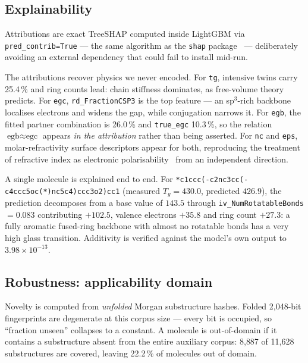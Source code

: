 \documentclass[11pt,a4paper]{article}
\newcommand{\prop}[1]{\texttt{#1}}
\begin{document}
\subsection{Explainability}

Attributions are exact TreeSHAP computed inside LightGBM via
\texttt{pred\_contrib=True} --- the same algorithm as the \texttt{shap}
package~\cite{lundberg2017,lundberg2020} --- deliberately avoiding an external
dependency that could fail to install mid-run.

The attributions recover physics we never encoded. For \prop{tg}, intensive
twins carry 25.4\,\% and ring counts lead: chain stiffness dominates, as
free-volume theory predicts. For \prop{egc}, \texttt{rd\_FractionCSP3} is the
top feature --- an sp$^3$-rich backbone localises electrons and widens the gap,
while conjugation narrows it. For \prop{egb}, the fitted partner combination is
26.0\,\% and \texttt{true\_egc} 10.3\,\%, so the relation
$\text{egb} \approx \text{egc}$ appears \emph{in the attribution} rather than
being asserted. For \prop{nc} and \prop{eps}, molar-refractivity surface
descriptors appear for both, reproducing the treatment of refractive index as
electronic polarisability~\cite{lightstone2020} from an independent direction.

A single molecule is explained end to end. For
\verb|*c1ccc(-c2nc3cc(-c4ccc5oc(*)nc5c4)ccc3o2)cc1| (measured
$T_g = 430.0$, predicted $426.9$), the prediction decomposes from a base value
of $143.5$ through \texttt{iv\_NumRotatableBonds} $= 0.083$ contributing
$+102.5$, valence electrons $+35.8$ and ring count $+27.3$: a fully aromatic
fused-ring backbone with almost no rotatable bonds has a very high glass
transition. Additivity is verified against the model's own output to
$3.98\times10^{-13}$.

\subsection{Robustness: applicability domain}

Novelty is computed from \emph{unfolded} Morgan substructure hashes. Folded
2{,}048-bit fingerprints are degenerate at this corpus size --- every bit is
occupied, so ``fraction unseen'' collapses to a constant. A molecule is
out-of-domain if it contains a substructure absent from the entire auxiliary
corpus: 8{,}887 of 11{,}628 substructures are covered, leaving 22.2\,\% of
molecules out of domain.
\end{document}
